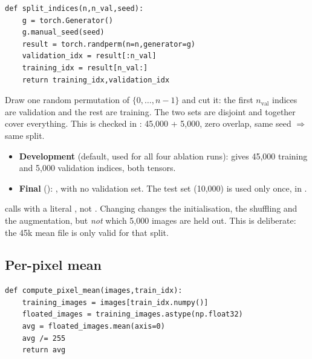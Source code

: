 \begin{lstlisting}[firstnumber=5]
def split_indices(n,n_val,seed):
    g = torch.Generator()
    g.manual_seed(seed)
    result = torch.randperm(n=n,generator=g)
    validation_idx = result[:n_val]
    training_idx = result[n_val:]
    return training_idx,validation_idx
\end{lstlisting}

\begin{idea}
Draw one random permutation of $\{0,\dots,n-1\}$ and cut it: the first $n_\text{val}$ indices are validation and the rest are training. The two sets are disjoint and together cover everything. This is checked in : 45{,}000 + 5{,}000, zero overlap, same seed $\Rightarrow$ same split.
\end{idea}

\begin{repo}
\begin{itemize}[nosep]
  \item \textbf{Development} (default, used for all four ablation runs):  gives 45{,}000 training and 5{,}000 validation indices, both  tensors.
  \item \textbf{Final} (): , with no validation set. The test set (10{,}000) is used only once, in .
\end{itemize}
\end{repo}

\begin{warn}
 calls  with a literal , not . Changing  changes the initialisation, the shuffling and the augmentation, but \emph{not} which 5{,}000 images are held out. This is deliberate: the 45k mean file  is only valid for that split.
\end{warn}

\subsection{Per-pixel mean}
\label{sec:mean}

\begin{lstlisting}[firstnumber=13]
def compute_pixel_mean(images,train_idx):
    training_images = images[train_idx.numpy()]
    floated_images = training_images.astype(np.float32)
    avg = floated_images.mean(axis=0)
    avg /= 255
    return avg
\end{lstlisting}

